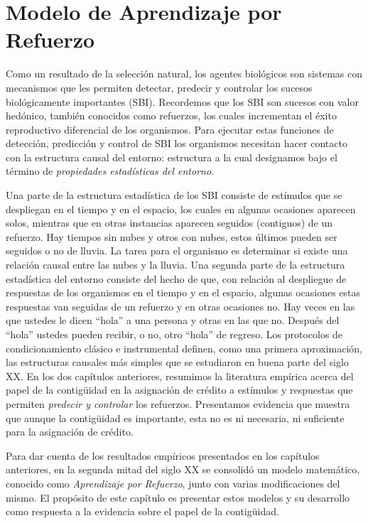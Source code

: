 \documentclass[
  a4paper,
  DIV=11,
  numbers=noendperiod]{scrreprt}
\begin{document}

\chapter{Modelo de Aprendizaje por
Refuerzo}\label{modelo-de-aprendizaje-por-refuerzo}

Como un resultado de la selección natural, los agentes biológicos son
sistemas con mecanismos que les permiten detectar, predecir y controlar
los sucesos biológicamente importantes (SBI). Recordemos que los SBI son
sucesos con valor hedónico, también conocidos como refuerzos, los cuales
incrementan el éxito reproductivo diferencial de los organismos. Para
ejecutar estas funciones de detección, predicción y control de SBI los
organismos necesitan hacer contacto con la estructura causal del
entorno: estructura a la cual designamos bajo el término de
\emph{propiedades estadísticas del entorno}.

Una parte de la estructura estadística de los SBI consiste de estímulos
que se despliegan en el tiempo y en el espacio, los cuales en algunas
ocasiones aparecen solos, mientras que en otras instancias aparecen
seguidos (contiguos) de un refuerzo. Hay tiempos sin nubes y otros con
nubes, estos últimos pueden ser seguidos o no de lluvia. La tarea para
el organismo es determinar si existe una relación causal entre las nubes
y la lluvia. Una segunda parte de la estructura estadística del entorno
consiste del hecho de que, con relación al despliegue de respuestas de
los organismos en el tiempo y en el espacio, algunas ocasiones estas
respuestas van seguidas de un refuerzo y en otras ocasiones no. Hay
veces en las que ustedes le dicen ``hola'' a una persona y otras en las
que no. Después del ``hola'' ustedes pueden recibir, o no, otro ``hola''
de regreso. Los protocolos de condicionamiento clásico e instrumental
definen, como una primera aproximación, las estructuras causales más
simples que se estudiaron en buena parte del siglo XX. En los dos
capítulos anteriores, resumimos la literatura empírica acerca del papel
de la contigüidad en la asignación de crédito a estímulos y respuestas
que permiten \emph{predecir y controlar} los refuerzos. Presentamos
evidencia que muestra que aunque la contigüidad es importante, esta no
es ni necesaria, ni suficiente para la asignación de crédito.

Para dar cuenta de los resultados empíricos presentados en los capítulos
anteriores, en la segunda mitad del siglo XX se consolidó un modelo
matemático, conocido como \emph{Aprendizaje por Refuerzo}, junto con
varias modificaciones del mismo. El propósito de este capítulo es
presentar estos modelos y su desarrollo como respuesta a la evidencia
sobre el papel de la contigüidad.
\end{document}
